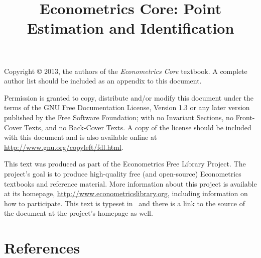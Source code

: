 \documentclass{tex/tufte-handout}
\title{Econometrics Core: Point Estimation and Identification}
\begin{document}
\maketitle

\bigskip\noindent%
Copyright © 2013, the authors of the \textit{Econometrics Core}
textbook.  A complete author list should be included as an appendix to
this document.

Permission is granted to copy, distribute and/or modify this document
under the terms of the GNU Free Documentation License, Version 1.3 or
any later version published by the Free Software Foundation; with no
Invariant Sections, no Front-Cover Texts, and no Back-Cover Texts.  A
copy of the license should be included with this document and is also
available online at \url{http://www.gnu.org/copyleft/fdl.html}.

This text was produced as part of the Econometrics Free Library
Project.  The project's goal is to produce high-quality free (and
open-source) Econometrics textbooks and reference material.  More
information about this project is available at its homepage,
\url{http://www.econometricslibrary.org}, including information on how
to participate.  This text is typeset in \XeLaTeX\ and there is a link
to the source of the document at the project's homepage as well.

%
\tableofcontents













% 

\part*{References}%

\end{document}
